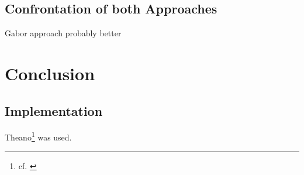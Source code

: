 \documentclass[11pt, a4paper]{article}
\begin{document}
\begin{itemize}
\subsection{Confrontation of both Approaches}

Gabor approach probably better

\newpage


\section{Conclusion}

\newpage


\begin{appendix}
	\section{Implementation}
	
	Theano\footnote{cf. \cite{theano}} was used.
	
\end{appendix}

\newpage

\listoffigures

\newpage

{}



\end{itemize}
\end{document}
